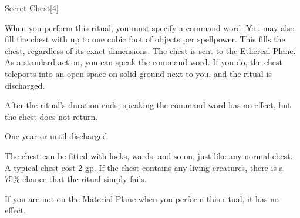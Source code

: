 \begin{spellsection}{Secret Chest}[4]
    \begin{spellheader}
    \end{spellheader}
    \begin{spellcontent}
        \begin{spelltargetinginfo}
        \end{spelltargetinginfo}
        \begin{spelleffects}

            \spellspecial When you perform this ritual, you must specify a command word. You may also fill the chest with up to one cubic foot of objects per spellpower. This fills the chest, regardless of its exact dimensions.
            \spellline
            \spelleffect The chest is sent to the Ethereal Plane. As a standard action, you can speak the command word. If you do, the chest teleports into an open space on solid ground next to you, and the ritual is discharged.

            After the ritual's duration ends, speaking the command word has no effect, but the chest does not return.

            \spelldur One year or until discharged
        \end{spelleffects}
    \end{spellcontent}
    \begin{spellfooter}
        \spellnotes The chest can be fitted with locks, wards, and so on, just like any normal chest. A typical chest cost 2 gp. If the chest contains any living creatures, there is a 75\% chance that the ritual simply fails.

        If you are not on the Material Plane when you perform this ritual, it has no effect.
    \end{spellfooter}
\end{spellsection}

